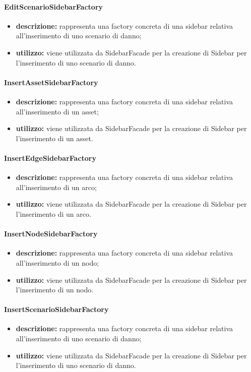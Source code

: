 \paragraph{EditScenarioSidebarFactory}
\begin{itemize}
	\item \textbf{descrizione:} rappresenta una factory concreta di una sidebar relativa all'inserimento di uno scenario di danno;
	\item \textbf{utilizzo:} viene utilizzata da SidebarFacade per la creazione di Sidebar per l'inserimento di uno scenario di danno.
\end{itemize}
\paragraph{InsertAssetSidebarFactory}
\begin{itemize}
	\item \textbf{descrizione:} rappresenta una factory concreta di una sidebar relativa all'inserimento di un asset;
	\item \textbf{utilizzo:} viene utilizzata da SidebarFacade per la creazione di Sidebar per l'inserimento di un asset.
\end{itemize}
\paragraph{InsertEdgeSidebarFactory}
\begin{itemize}
	\item \textbf{descrizione:} rappresenta una factory concreta di una sidebar relativa all'inserimento di un arco;
	\item \textbf{utilizzo:} viene utilizzata da SidebarFacade per la creazione di Sidebar per l'inserimento di un arco.
\end{itemize}
\paragraph{InsertNodeSidebarFactory}
\begin{itemize}
	\item \textbf{descrizione:} rappresenta una factory concreta di una sidebar relativa all'inserimento di un nodo;
	\item \textbf{utilizzo:} viene utilizzata da SidebarFacade per la creazione di Sidebar per l'inserimento di un nodo.
\end{itemize}
\paragraph{InsertScenarioSidebarFactory}
\begin{itemize}
	\item \textbf{descrizione:} rappresenta una factory concreta di una sidebar relativa all'inserimento di uno scenario di danno;
	\item \textbf{utilizzo:} viene utilizzata da SidebarFacade per la creazione di Sidebar per l'inserimento di uno scenario di danno.
\end{itemize}
